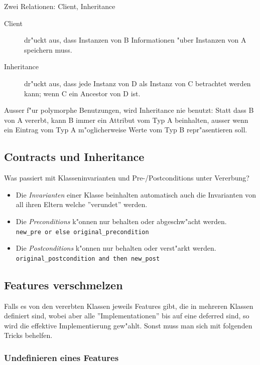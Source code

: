 \documentclass[german, 10pt, a4paper, twocolumn]{scrartcl}
\theoremstyle{definition}
\begin{document}
Zwei Relationen: Client, Inheritance

\begin{description}
	\item[Client] dr"uckt aus, dass Instanzen von B Informationen "uber Instanzen von A speichern muss.
	\item[Inheritance] dr"uckt aus, dass jede Instanz von D als Instanz von C betrachtet werden kann; wenn C ein Ancestor von D ist.
\end{description}

Ausser f"ur polymorphe Benutzungen, wird Inheritance nie benutzt: Statt dass B von A vererbt, kann B immer ein Attribut vom Typ A beinhalten, ausser wenn ein Eintrag vom Typ A m"oglicherweise Werte vom Typ B repr"asentieren soll.

\subsection{Contracts und Inheritance}

Was passiert mit Klasseninvarianten und Pre-/Postconditions unter Vererbung?

\begin{itemize}
	\item Die \textit{Invarianten} einer Klasse beinhalten automatisch auch die Invarianten von all ihren Eltern welche ''verundet'' werden.
	\item Die \textit{Preconditions} k"onnen nur behalten oder abgeschw"acht werden.\\
		\verb#new_pre or else original_precondition#
	\item Die \textit{Postconditions} k"onnen nur behalten oder verst"arkt werden.\\
		\verb#original_postcondition and then new_post#
\end{itemize}

\subsection{Features verschmelzen}

Falls es von den vererbten Klassen jeweils Features gibt, die in mehreren Klassen definiert sind, wobei aber alle ''Implementationen'' bis auf eine deferred sind, so wird die effektive Implementierung gew"ahlt. Sonst muss man sich mit folgenden Tricks behelfen.

\subsubsection{Undefinieren eines Features}
\end{document}
